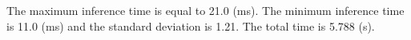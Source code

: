 \documentclass[12pt,a4paper]{article}
\begin{document}
The maximum inference time is equal to 21.0 (ms). The minimum inference time is 11.0 (ms) and the standard deviation is 1.21. The total time is 5.788 (s).

\end{document}
